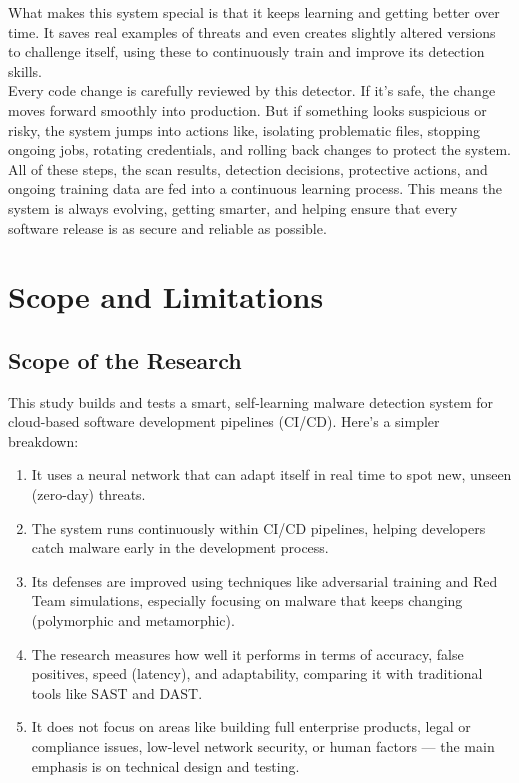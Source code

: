 What makes this system special is that it keeps learning and getting better over time. It saves real examples of threats and even creates slightly altered versions to challenge itself, using these to continuously train and improve its detection skills.\\

Every code change is carefully reviewed by this detector. If it’s safe, the change moves forward smoothly into production. But if something looks suspicious or risky, the system jumps into actions like, isolating problematic files, stopping ongoing jobs, rotating credentials, and rolling back changes to protect the system.\\

All of these steps, the scan results, detection decisions, protective actions, and ongoing training data are fed into a continuous learning process. This means the system is always evolving, getting smarter, and helping ensure that every software release is as secure and reliable as possible.


\section{Scope and Limitations}
\subsection{Scope of the Research}
This study builds and tests a smart, self-learning malware detection system for cloud-based software development pipelines (CI/CD). Here’s a simpler breakdown:
\begin{enumerate}
    \item It uses a neural network that can adapt itself in real time to spot new, unseen (zero-day) threats.
    \item The system runs continuously within CI/CD pipelines, helping developers catch malware early in the development process.
    \item Its defenses are improved using techniques like adversarial training and Red Team simulations, especially focusing on malware that keeps changing (polymorphic and metamorphic).
    \item The research measures how well it performs in terms of accuracy, false positives, speed (latency), and adaptability, comparing it with traditional tools like SAST and DAST.
    \item It does not focus on areas like building full enterprise products, legal or compliance issues, low-level network security, or human factors — the main emphasis is on technical design and testing.
\end{enumerate}

